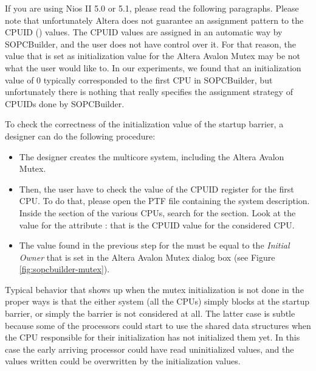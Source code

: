 \begin{warning}
If you are using Nios II 5.0 or 5.1, please read the following
paragraphs.  Please note that unfortunately Altera does not guarantee
an assignment pattern to the CPUID () values. The CPUID
values are assigned in an automatic way by SOPCBuilder, and the user
does not have control over it. For that reason, the value that is set
as initialization value for the Altera Avalon Mutex may be not what
the user would like to. In our experiments, we found that an
initialization value of 0 typically corresponded to the first CPU in
SOPCBuilder, but unfortunately there is nothing that really specifies
the assignment strategy of CPUIDs done by SOPCBuilder.

To check the correctness of the initialization value of the startup
barrier, a designer can do the following procedure:
\begin{itemize}
\item The designer creates the multicore system, including the
  Altera Avalon Mutex.

\item Then, the user have to check the value of the CPUID register for
  the first CPU. To do that, please open the PTF file containing the
  system description. Inside the  section of the various
  CPUs, search for the  section. Look
  at the value for the attribute : that is the
  CPUID value for the considered CPU.

\item The value found in the previous step for the 
  must be equal to the {\em Initial Owner} that is set in the Altera
  Avalon Mutex dialog box (see Figure \ref{fig:sopcbuilder-mutex}).
\end{itemize}
\end{warning}

\begin{warning}
Typical behavior that shows up when the mutex initialization is not
done in the proper ways is that the either system (all the CPUs)
simply blocks at the startup barrier, or simply the barrier is not
considered at all. The latter case is subtle because some of the
processors could start to use the shared data structures when the CPU
responsible for their initialization has not initialized them yet. In
this case the early arriving processor could have read uninitialized
values, and the values written could be overwritten by the
initialization values.
\end{warning}

